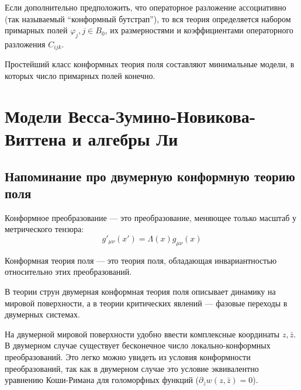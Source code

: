 Если дополнительно предположить, что операторное разложение ассоциативно (так называемый ``конформный бутстрап''), то вся теория определяется набором примарных полей $\varphi_{j}, j\in B_{0}$, их размерностями и коэффициентами операторного разложения $C_{ijk}$.

Простейший класс конформных теория поля составляют минимальные модели, в которых число примарных полей конечно. 


\section{Модели Весса-Зумино-Новикова-Виттена и алгебры Ли}
\label{sec:WZNW-models}

\subsection{Напоминание про двумерную конформную теорию поля}
\label{sec:CFT}

Конформное преобразование --- это преобразование, меняющее только масштаб у метрического тензора:
\begin{equation}
  \label{eq:10}
  g'_{\mu\nu}(x')=\Lambda(x)g_{\mu\nu}(x)
\end{equation}

Конформная теория поля --- это теория поля, обладающая инвариантностью относительно этих преобразований.

В теории струн двумерная конформная теория поля описывает динамику на мировой поверхности, а в
теории критических явлений --- фазовые переходы в двумерных системах.

На двумерной мировой поверхности удобно ввести комплексные координаты $z,\bar{z}$. 
В двумерном случае существует бесконечное число локально-конформных преобразований.
Это легко можно увидеть из условия конформности преобразований, так как в двумерном случае это
условие эквивалентно уравнению Коши-Римана для голоморфных функций ($\partial_{\bar z}w(z,\bar
z)=0$).

